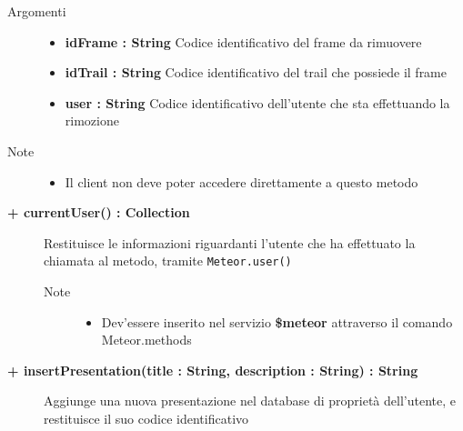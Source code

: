 \begin{description}
\begin{description}
		\begin{description}
			\item[Argomenti] \hfill
				\begin{itemize}
				
					\item \textbf{idFrame : String			} \hfill
					Codice identificativo del frame da rimuovere
					\item \textbf{idTrail : String			} \hfill
					Codice identificativo del trail che possiede il frame
					\item \textbf{user : String			} \hfill
					Codice identificativo dell'utente che sta effettuando la rimozione
					
				\end{itemize}
			\item[Note] \hfill
			\begin{itemize}
					\item Il client non deve poter accedere direttamente a questo metodo
				\end{itemize}
		\end{description}
	\end{description}

	\begin{description}
		\item[\textbf{\color{blue}+ currentUser() : Collection			}] \hfill
			Restituisce le informazioni riguardanti l'utente che ha effettuato la chiamata al metodo, tramite \texttt{Meteor.user()}
			
		\begin{description}
			
			\item[Note] \hfill
			\begin{itemize}
					\item Dev'essere inserito nel servizio \textbf{\$meteor} attraverso il comando Meteor.methods
				\end{itemize}
		\end{description}
	\end{description}

	\begin{description}
		\item[\textbf{\color{blue}+ insertPresentation(title : String, description : String) : String			}] \hfill
			Aggiunge una nuova presentazione nel database di proprietà dell'utente, e restituisce il suo codice identificativo
			

\end{description}
\end{description}
